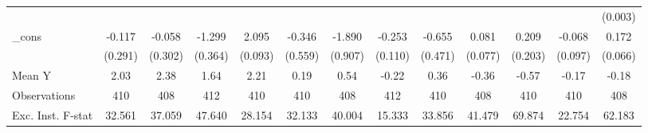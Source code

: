 {\begin{tabular}{l*{12}{c}}
            &                     &                     &                     &                     &                     &                     &                     &                     &                     &                     &                     &     (0.003)         \\
\addlinespace
\_cons      &      -0.117         &      -0.058         &      -1.299\sym{***}&       2.095\sym{***}&      -0.346         &      -1.890\sym{**} &      -0.253\sym{**} &      -0.655         &       0.081         &       0.209         &      -0.068         &       0.172\sym{**} \\
            &     (0.291)         &     (0.302)         &     (0.364)         &     (0.093)         &     (0.559)         &     (0.907)         &     (0.110)         &     (0.471)         &     (0.077)         &     (0.203)         &     (0.097)         &     (0.066)         \\
\midrule
Mean Y      &        2.03         &        2.38         &        1.64         &        2.21         &        0.19         &        0.54         &       -0.22         &        0.36         &       -0.36         &       -0.57         &       -0.17         &       -0.18         \\
Observations&         410         &         408         &         412         &         410         &         410         &         408         &         412         &         410         &         408         &         410         &         410         &         408         \\
Exc. Inst. F-stat&      32.561         &      37.059         &      47.640         &      28.154         &      32.133         &      40.004         &      15.333         &      33.856         &      41.479         &      69.874         &      22.754         &      62.183         \\
\bottomrule
\end{tabular}
}
